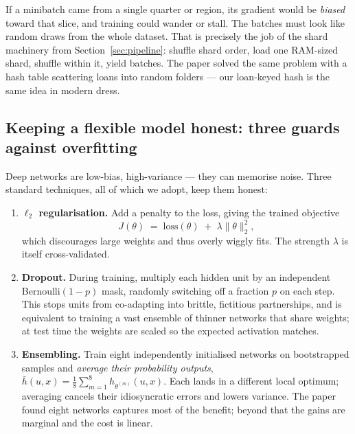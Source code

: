 \documentclass[11pt]{article}
\begin{document}
\begin{intuition}
If a minibatch came from a single quarter or region, its gradient would be \emph{biased}
toward that slice, and training could wander or stall. The batches must look like random
draws from the whole dataset. That is precisely the job of the shard machinery from
Section~\ref{sec:pipeline}: shuffle shard order, load one RAM-sized shard, shuffle within it,
yield batches. The paper solved the same problem with a hash table scattering loans into
random folders --- our loan-keyed hash is the same idea in modern dress.
\end{intuition}

\subsection{Keeping a flexible model honest: three guards against overfitting}

Deep networks are low-bias, high-variance --- they can memorise noise. Three standard
techniques, all of which we adopt, keep them honest:

\begin{enumerate}[leftmargin=1.6em, itemsep=3pt]
  \item \textbf{$\ell_2$ regularisation.} Add a penalty to the loss, giving the trained
        objective
        \[
          J(\theta) \;=\; \text{loss}(\theta) \;+\; \lambda\lVert\theta\rVert_2^2,
        \]
        which discourages large weights and thus overly wiggly fits. The strength $\lambda$
        is itself cross-validated.
  \item \textbf{Dropout.} During training, multiply each hidden unit by an independent
        Bernoulli$(1{-}p)$ mask, randomly switching off a fraction $p$ on each step. This
        stops units from co-adapting into brittle, fictitious partnerships, and is
        equivalent to training a vast ensemble of thinner networks that share weights; at
        test time the weights are scaled so the expected activation matches.
  \item \textbf{Ensembling.} Train eight independently initialised networks on bootstrapped
        samples and \emph{average their probability outputs},
        $\bar h(u,x) = \tfrac{1}{8}\sum_{m=1}^{8} h_{\theta^{(m)}}(u,x)$. Each lands in a
        different local optimum; averaging cancels their idiosyncratic errors and lowers
        variance. The paper found eight networks captures most of the benefit; beyond that
        the gains are marginal and the cost is linear.
\end{enumerate}
\end{document}
